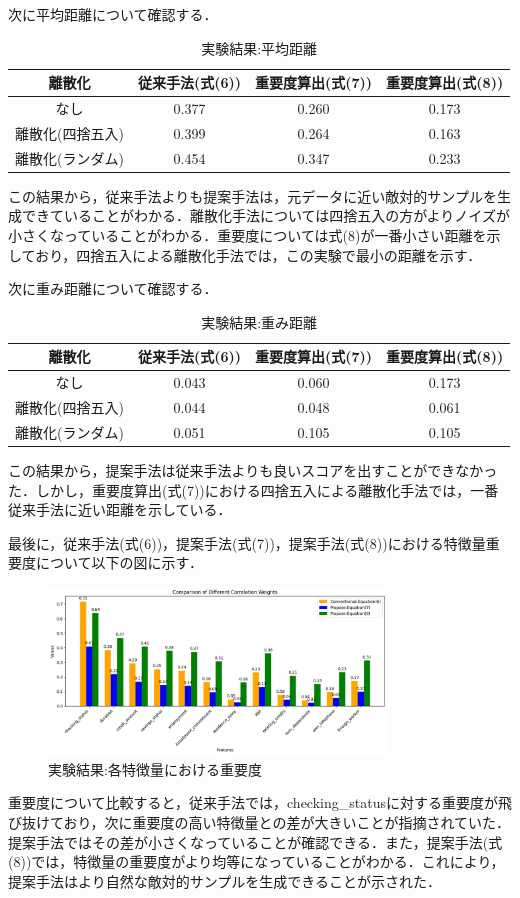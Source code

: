 次に平均距離について確認する．
\begin{table}[H]
    \centering
    \caption{実験結果:平均距離}
    \begin{tabular}{|c|c|c|c|} \hline
        離散化 & 従来手法(式(6)) & 重要度算出(式(7)) & 重要度算出(式(8)) \\ \hline
        なし & 0.377 & 0.260 & 0.173 \\ \hline
        離散化(四捨五入) & 0.399 & 0.264 & 0.163 \\ \hline
        離散化(ランダム) & 0.454 & 0.347 & 0.233 \\ \hline
    \end{tabular}
\end{table}
この結果から，従来手法よりも提案手法は，元データに近い敵対的サンプルを生成できていることがわかる．離散化手法については四捨五入の方がよりノイズが小さくなっていることがわかる．重要度については式(8)が一番小さい距離を示しており，四捨五入による離散化手法では，この実験で最小の距離を示す．

次に重み距離について確認する．
\begin{table}[H]
    \centering
    \caption{実験結果:重み距離}
    \begin{tabular}{|c|c|c|c|} \hline
        離散化 & 従来手法(式(6)) & 重要度算出(式(7)) & 重要度算出(式(8)) \\ \hline
        なし & 0.043 & 0.060 & 0.173\\ \hline
        離散化(四捨五入) & 0.044 & 0.048 & 0.061 \\ \hline
        離散化(ランダム) & 0.051 & 0.105 & 0.105 \\ \hline
    \end{tabular}
\end{table}
この結果から，提案手法は従来手法よりも良いスコアを出すことができなかった．しかし，重要度算出(式(7))における四捨五入による離散化手法では，一番従来手法に近い距離を示している．

最後に，従来手法(式(6))，提案手法(式(7))，提案手法(式(8))における特徴量重要度について以下の図に示す．
\begin{figure}[H]
    \centering
    \includegraphics[width=0.8\textwidth]{images/実験_重要度算出の結果.png}
    \caption{実験結果:各特徴量における重要度}
    \label{fig:adversarial_example}
\end{figure}
重要度について比較すると，従来手法では，checking\_statusに対する重要度が飛び抜けており，次に重要度の高い特徴量との差が大きいことが指摘されていた．提案手法ではその差が小さくなっていることが確認できる．また，提案手法(式(8))では，特徴量の重要度がより均等になっていることがわかる．これにより，提案手法はより自然な敵対的サンプルを生成できることが示された．
